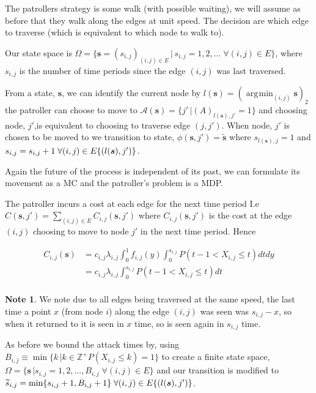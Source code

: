 \documentclass[a4paper,10pt]{article}
\DeclareMathOperator*{\argmin}{\arg\!\min}
\theoremstyle{definition}
\theoremstyle{definition}
\theoremstyle{remark}
\theoremstyle{definition}
\newtheorem*{note}{Note}
\begin{document}
The patrollers strategy is some walk (with possible waiting), we will assume as before that they walk along the edges at unit speed. The decision are which edge to traverse (which is equivalent to which node to walk to).

Our state space is $\Omega= \{ \bm{s}=(s_{i,j})_{(i,j) \in E} \, | \, s_{i,j}=1,2,... \; \forall (i,j) \in E \}$, where $s_{i,j}$ is the number of time periods since the edge $(i,j)$ was last traversed.

From a state, $\bm{s}$, we can identify the current node by $l(\bm{s}) = (\argmin_{(i,j)} \bm{s})_{2} $ the patroller can choose to move to $\mathcal{A}(\bm{s})= \{ j' \, | (A)_{l(\bm{s}),j'}=1 \}$  and choosing node, $j'$,is equivalent to choosing to traverse edge $(j,j')$. When node, $j'$ is chosen to be moved to we transition to state, $\phi(\bm{s},j')=\widetilde{\bm{s}}$ where $s_{l(\bm{s}),j}=1$ and $s_{i,j}=s_{i,j}+1 \; \forall (i,j) \in E \\ \{(l(\bm{s}),j') \}$. 

Again the future of the process is independent of its past, we can formulate its  movement as a MC and the patroller's problem is a MDP.

The patroller incurs a cost at each edge for the next time period I.e $C(\bm{s},j')=\sum\limits_{(i,j) \in E} C_{i,j}(\bm{s},j')$ where $C_{i,j}(\bm{s},j')$ is the cost at the edge $(i,j)$ choosing to move to node $j'$ in the next time period. Hence

\begin{align*}
C_{i,j}(\bm{s})&= c_{i,j} \lambda_{i,j} \int_{0}^{1} f_{i,j}(y) \int_{0}^{s_{i,j}} P(t-1 < X_{i,j} \leq t) dt dy \\
&= c_{i,j} \lambda_{i,j} \int_{0}^{s_{i,j}} P(t-1 < X_{i,j} \leq t) dt \\
\end{align*}

\begin{note}
We note due to all edges being traversed at the same speed, the last time a point $x$ (from node $i$) along the edge $(i,j)$ was seen was $s_{i,j}-x$, so when it returned to it is seen in $x$ time, so is seen again in $s_{i,j}$ time.
\end{note}

As before we bound the attack times by, using $B_{i,j} \equiv \min \{ k \, | k \in \mathbb{Z}^{+} P(X_{i,j} \leq k)=1 \}$ to create a finite state space, $\Omega= \{\bm{s} \, | s_{i,j}=1,2,...,B_{i,j} \; \forall (i,j) \in E \}$ and our transition is modified to $\widetilde{s}_{i,j}=\min\{s_{i,j}+1,B_{i,j}+1 \} \; \forall (i,j) \in E \\ \{(l(\bm{s}),j') \}$.
\end{document}
